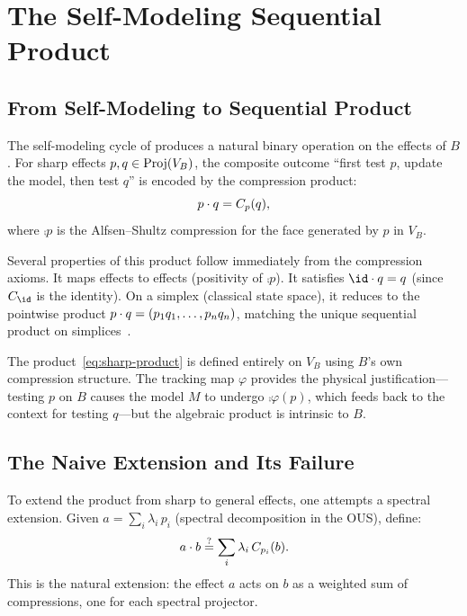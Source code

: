 \documentclass[11pt]{article}
\begin{document}
\section{The Self-Modeling Sequential Product}
\label{sec:sp}


\subsection{From Self-Modeling to Sequential Product}
\label{sec:sp-sharp}

The self-modeling cycle of  produces a natural
binary operation on the effects of $B$.  For sharp effects
$p, q \in \Proj(V_{B})$, the composite outcome ``first test $p$,
update the model, then test $q$'' is encoded by the compression
product:
\begin{equation}\label{eq:sharp-product}
  \sp{p}{q} = \comp{p}(q),
\end{equation}
where $\comp{p}$ is the Alfsen--Shultz compression for the face
generated by $p$ in $V_{B}$.

Several properties of this product follow immediately from the
compression axioms.  It maps effects to effects (positivity of
$\comp{p}$).  It satisfies $\sp{\id}{q} = q$ (since $\comp{\id}$ is
the identity).  On a simplex (classical state space), it reduces to
the pointwise product
$\sp{p}{q} = (p_{1}q_{1}, \ldots, p_{n}q_{n})$, matching the unique
sequential product on simplices~\cite{GudderGreechie2002}.

\begin{remark}
  The product~\eqref{eq:sharp-product} is defined entirely on
  $V_{B}$ using $B$'s own compression structure.  The tracking map
  $\varphi$ provides the physical justification---testing $p$ on $B$
  causes the model $M$ to undergo $\comp{\varphi(p)}$, which feeds
  back to the context for testing $q$---but the algebraic product is
  intrinsic to $B$.
\end{remark}


\subsection{The Naive Extension and Its Failure}
\label{sec:sp-naive}

To extend the product from sharp to general effects, one attempts a
spectral extension.  Given $a = \sum_{i} \lambda_{i}\, p_{i}$
(spectral decomposition in the OUS), define:
\begin{equation}\label{eq:naive}
  \sp{a}{b} \stackrel{?}{=}
    \sum_{i} \lambda_{i}\, \comp{p_{i}}(b).
\end{equation}
This is the natural extension: the effect $a$ acts on $b$ as a
weighted sum of compressions, one for each spectral projector.
\end{document}
